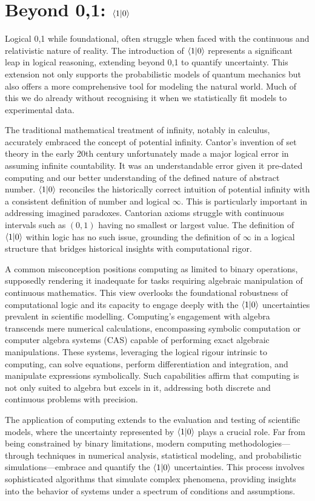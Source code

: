 \documentclass[12pt]{article}
\begin{document}
\section*{Beyond {0,1}: \(\langle 1 | 0 \rangle\)}
Logical {0,1} while foundational, often struggle when faced with the continuous and relativistic nature of reality. The introduction of \(\langle 1 | 0 \rangle\) represents a significant leap in logical reasoning, extending beyond {0,1} to quantify uncertainty. This extension not only supports the probabilistic models of quantum mechanics but also offers a more comprehensive tool for modeling the natural world. Much of this we do already without recognising it when we statistically fit models to experimental data.

The traditional mathematical treatment of infinity, notably in calculus, accurately embraced the concept of potential infinity. Cantor's invention of set theory in the early 20th century unfortunately made a major logical error in assuming infinite countability. It was an understandable error given it pre-dated computing and our better understanding of the defined nature of abstract number. \(\langle 1 | 0 \rangle\) reconciles the historically correct intuition of potential infinity with a consistent definition of number and logical \(\infty\). This is particularly important in addressing imagined paradoxes. Cantorian axioms struggle with continuous intervals such as \((0,1)\) having no smallest or largest value. The definition of \(\langle 1 | 0 \rangle\) within logic has no such issue, grounding the definition of \(\infty\) in a logical structure that bridges historical insights with computational rigor.

A common misconception positions computing as limited to binary operations, supposedly rendering it inadequate for tasks requiring algebraic manipulation of continuous mathematics. This view overlooks the foundational robustness of computational logic and its capacity to engage deeply with the \(\langle 1 | 0 \rangle\) uncertainties prevalent in scientific modelling. Computing's engagement with algebra transcends mere numerical calculations, encompassing symbolic computation or computer algebra systems (CAS) capable of performing exact algebraic manipulations. These systems, leveraging the logical rigour intrinsic to computing, can solve equations, perform differentiation and integration, and manipulate expressions symbolically. Such capabilities affirm that computing is not only suited to algebra but excels in it, addressing both discrete and continuous problems with precision.

The application of computing extends to the evaluation and testing of scientific models, where the uncertainty represented by \(\langle 1 | 0 \rangle\) plays a crucial role. Far from being constrained by binary limitations, modern computing methodologies—through techniques in numerical analysis, statistical modeling, and probabilistic simulations—embrace and quantify the \(\langle 1 | 0 \rangle\) uncertainties. This process involves sophisticated algorithms that simulate complex phenomena, providing insights into the behavior of systems under a spectrum of conditions and assumptions.
\end{document}
